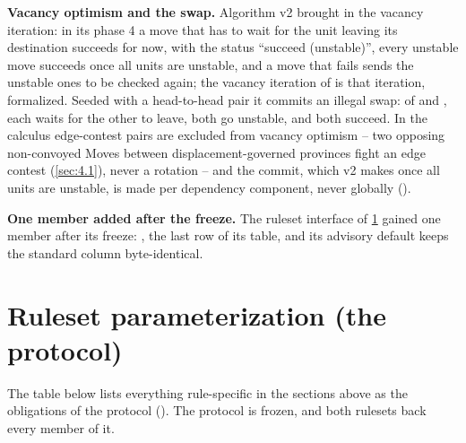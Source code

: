 \documentclass[12pt,a4paper]{article}
\begin{document}
 \textbf{Vacancy optimism and the swap.}
Algorithm v2 brought in the vacancy iteration: in its phase 4 a move that has to wait for the unit leaving its destination succeeds for now, with the status ``succeed (unstable)'', every unstable move succeeds once all units are unstable, and a move that fails sends the unstable ones to be checked again; the vacancy iteration of  is that iteration, formalized.
Seeded with a head-to-head pair it commits an illegal swap: of  and , each waits for the other to leave, both go unstable, and both succeed.
In the calculus edge-contest pairs are excluded from vacancy optimism -- two opposing non-convoyed Moves between displacement-governed provinces fight an edge contest (\cref{sec:4.1}), never a rotation -- and the commit, which v2 makes once all units are unstable, is made per dependency component, never globally ().

\textbf{One member added after the freeze.}
The ruleset interface of \cref{sec:7} gained one member after its freeze: , the last row of its table, and its advisory default keeps the standard column byte-identical.

\section{Ruleset parameterization (the \texorpdfstring{}{Ruleset} protocol)}\label{sec:7}

The table below lists everything rule-specific in the sections above as the obligations of the protocol ().
The protocol is frozen, and both rulesets back every member of it.
\end{document}

